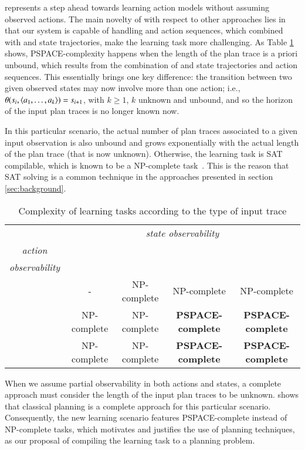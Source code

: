 \FAMA represents a step ahead towards learning action models without assuming observed actions. The main novelty of \FAMA with respect to other approaches lies in that our system is capable of handling \PO and \NO action sequences, which combined with \PO and \NO state trajectories, make the learning task more challenging. As Table \ref{tab:complex} shows, PSPACE-complexity happens when the length of the plan trace is a priori unbound, which results from the combination of \PO and \NO state trajectories and action sequences.  This essentially brings one key difference: the transition between two given observed states may now involve more than one action; i.e., $\theta(s_i,{\langle a_1,\ldots,a_k \rangle})=s_{i+1}$, with $k \geq 1$, $k$ unknown and unbound, and so the horizon of the input plan traces is no longer known now.

In this particular scenario, the actual number of plan traces associated to a given input observation is also unbound and grows exponentially with the actual length of the plan trace (that is now unknown). Otherwise, the learning task is SAT compilable, which is known to be a NP-complete task~\cite{russell2016artificial}. This is the reason that SAT solving is a common technique in the approaches presented in section \ref{sec:background}.


\begin{table}[ht]
\centering
\begin{tabular}{c|c|c|c|c|}
	& \multicolumn{4}{c|}{\emph{state observability}} \\ \cline{2-5}
	\multirow{1}{*}{\emph{action}} & \FO & \POstar & \PO & \NO\\ {\emph{observability}} & & & & \\ \hline
	\FO & - & NP-complete & NP-complete & NP-complete \\ \hline
	\PO & NP-complete & NP-complete & \textbf{PSPACE-complete} & \textbf{PSPACE-complete} \\ \hline
	\NO & NP-complete & NP-complete & \textbf{PSPACE-complete} & \textbf{PSPACE-complete} \\ \hline
\end{tabular}
\caption{Complexity of learning tasks according to the type of input trace}
\label{tab:complex}
\end{table}


When we assume partial observability in both actions and states, a complete approach must consider the length of the input plan traces to be unknown. \FAMA shows that classical planning is a complete approach for this particular scenario. Consequently, the new learning scenario features PSPACE-complete instead of NP-complete tasks, which motivates and justifies the use of planning techniques, as our proposal of compiling the learning task to a planning problem.

